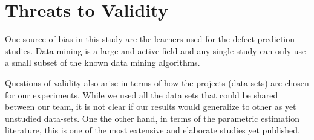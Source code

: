 \documentclass[smallcondesed]{svjour3}
\newcommand{\tion}[1]{\S\ref{sect:#1}}
\newcommand{\fig}[1]{Figure~\ref{fig:#1}}
\begin{document}



\section{Threats to Validity}







One source of bias in this study
are the learners used for the defect prediction
studies. Data mining is a large and active field and
any single study can only use a small subset of the
known data mining algorithms.  

Questions of validity also arise in terms of how the
projects (data-sets) are chosen for our experiments.
While we used all the data sets that could be shared
between our team, it is not clear if our results
would generalize to other as yet unstudied
data-sets. One the other hand, in terms of the
parametric estimation literature, this is one of the most extensive
and elaborate studies yet published.
\end{document}
